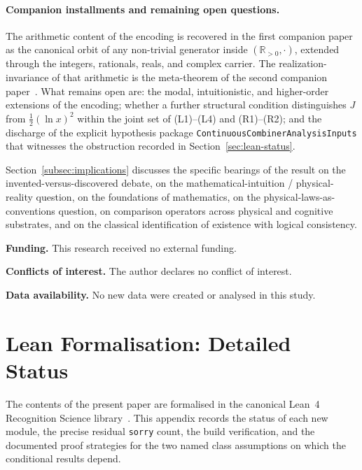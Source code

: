 \documentclass[11pt,a4paper]{article}
\theoremstyle{definition}
\theoremstyle{remark}
\begin{document}
\paragraph{Companion installments and remaining open questions.} The
arithmetic content of the encoding is recovered in the first
companion paper~\cite{Washburn2026Arithmetic} as the canonical orbit
of any non-trivial generator inside $(\mathbb{R}_{>0}, \cdot)$,
extended through the integers, rationals, reals, and complex carrier.
The realization-invariance of that arithmetic is the meta-theorem of
the second companion paper~\cite{Washburn2026UniversalForcing}. What
remains open are: the modal, intuitionistic, and higher-order
extensions of the encoding; whether a further structural condition
distinguishes $J$ from $\tfrac{1}{2}(\ln x)^2$ within the joint set
of (L1)--(L4) and (R1)--(R2); and the discharge of the explicit
hypothesis package \texttt{ContinuousCombinerAnalysisInputs} that
witnesses the obstruction recorded in
Section~\ref{sec:lean-status}.

Section~\ref{subsec:implications} discusses the specific bearings of
the result on the invented-versus-discovered debate, on the
mathematical-intuition / physical-reality question, on the
foundations of mathematics, on the physical-laws-as-conventions
question, on comparison operators across physical and cognitive
substrates, and on the classical identification of existence with
logical consistency.

\bigskip

\noindent\textbf{Funding.} This research received no external funding.

\noindent\textbf{Conflicts of interest.} The author declares no conflict of
interest.

\noindent\textbf{Data availability.} No new data were created or analysed
in this study.

\appendix

\section{Lean Formalisation: Detailed Status}\label{app:lean}

The contents of the present paper are formalised in the canonical
Lean~4 Recognition Science library~\cite{LeanLibrary2026}. This
appendix records the status of each new module, the precise residual
\texttt{sorry} count, the build verification, and the documented
proof strategies for the two named class assumptions on which the
conditional results depend.
\end{document}
